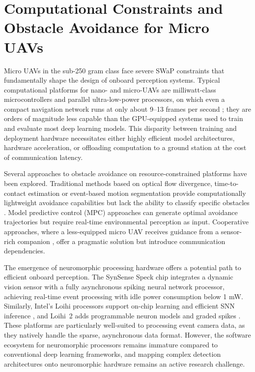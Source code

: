 \documentclass[11pt, a4paper]{report}
\begin{document}
\section{Computational Constraints and Obstacle Avoidance for Micro UAVs}
Micro UAVs in the sub-250 gram class face severe SWaP constraints that fundamentally shape the design of onboard perception systems. Typical computational platforms for nano- and micro-UAVs are milliwatt-class microcontrollers and parallel ultra-low-power processors, on which even a compact navigation network runs at only about 9--13 frames per second \cite{niculescu2021improving}; they are orders of magnitude less capable than the GPU-equipped systems used to train and evaluate most deep learning models. This disparity between training and deployment hardware necessitates either highly efficient model architectures, hardware acceleration, or offloading computation to a ground station at the cost of communication latency. 

Several approaches to obstacle avoidance on resource-constrained platforms have been explored. Traditional methods based on optical flow divergence, time-to-contact estimation or event-based motion segmentation provide computationally lightweight avoidance capabilities but lack the ability to classify specific obstacles \cite{decroon2016monocular, falanga2020dynamic}. Model predictive control (MPC) approaches can generate optimal avoidance trajectories but require real-time environmental perception as input. Cooperative approaches, where a less-equipped micro UAV receives guidance from a sensor-rich companion \cite{pritzl2024drones}, offer a pragmatic solution but introduce communication dependencies. 

The emergence of neuromorphic processing hardware offers a potential path to efficient onboard perception. The SynSense Speck chip \cite{synsense2026speck} integrates a dynamic vision sensor with a fully asynchronous spiking neural network processor, achieving real-time event processing with idle power consumption below 1 mW. Similarly, Intel's Loihi processors support on-chip learning and efficient SNN inference \cite{davies2021advancing}, and Loihi~2 adds programmable neuron models and graded spikes \cite{orchard2021efficient}. These platforms are particularly well-suited to processing event camera data, as they natively handle the sparse, asynchronous data format. However, the software ecosystem for neuromorphic processors remains immature compared to conventional deep learning frameworks, and mapping complex detection architectures onto neuromorphic hardware remains an active research challenge. 
\end{document}
